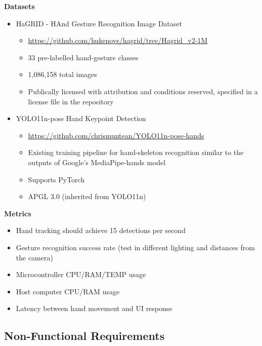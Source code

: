 \documentclass{article}
\begin{document}
\textbf{Datasets}
\begin{itemize}
\item HaGRID - HAnd Gesture Recognition Image Dataset
    \begin{itemize}
    \item \href{https://github.com/hukenovs/hagrid/tree/Hagrid\_v2-1M}{https://github.com/hukenovs/hagrid/tree/Hagrid\_v2-1M}
    \item 33 pre-labelled hand-gesture classes
    \item 1,086,158 total images
    \item Publically licensed with attribution and conditions reserved, specified in a license file in the repository
    \end{itemize}
\item YOLO11n-pose Hand Keypoint Detection
    \begin{itemize}
        \item \href{https://github.com/chrismuntean/YOLO11n-pose-hands}{https://github.com/chrismuntean/YOLO11n-pose-hands}
        \item Existing training pipeline for hand-skeleton recognition similar to the outputs of Google's MediaPipe-hands model
        \item Supports PyTorch
        \item APGL 3.0 (inherited from YOLO11n)
    \end{itemize}
\end{itemize}

\textbf{Metrics}
\begin{itemize}
\item Hand tracking should achieve 15 detections per second
\item Gesture recognition success rate (test in different lighting and distances from the camera)
\item Microcontroller CPU/RAM/TEMP usage
\item Host computer CPU/RAM usage
\item Latency between hand movement and UI response
\end{itemize}

\subsection{Non-Functional Requirements}
\end{document}

